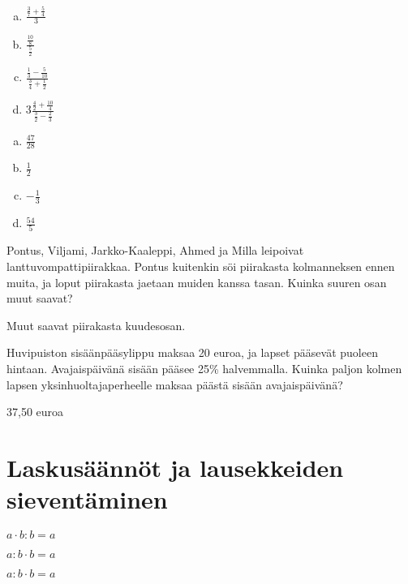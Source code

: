 \begin{tehtava} %

\begin{enumerate}[a)]
	\item $ \frac{\frac{3}{7} + \frac{5}{4}}{3}$
	\item $ \frac{\frac{10}{8}}{\frac{5}{2}}$
	\item $ \frac{\frac{1}{3} - \frac{5}{10}}{\frac{3}{4} + \frac{1}{2}}$
	\item $ 3\frac{\frac{4}{2} + \frac{10}{4}}{\frac{3}{2} - \frac{2}{3}}$
\end{enumerate}
    \begin{vastaus}		
		\begin{enumerate}[a)]
			\item $\frac{47}{28}$
			\item $\frac{1}{2}$
			\item $-\frac{1}{3}$
			\item $\frac{54}{5}$
		\end{enumerate}
    \end{vastaus}
\end{tehtava}

\begin{tehtava} %
    Pontus, Viljami, Jarkko-Kaaleppi, Ahmed ja Milla leipoivat lanttuvompattipiirakkaa.
    Pontus kuitenkin söi piirakasta kolmanneksen ennen muita, ja loput piirakasta
    jaetaan muiden kanssa tasan. Kuinka suuren osan muut saavat?
    
    \begin{vastaus}
        Muut saavat piirakasta kuudesosan.
    \end{vastaus}
\end{tehtava}

\begin{tehtava} %
    Huvipuiston sisäänpääsylippu maksaa 20 euroa, ja lapset pääsevät puoleen
    hintaan. Avajaispäivänä sisään pääsee 25\% halvemmalla. Kuinka paljon kolmen
    lapsen yksinhuoltajaperheelle maksaa päästä sisään avajaispäivänä?
    
    \begin{vastaus}
        37,50 euroa
    \end{vastaus}
\end{tehtava}

\chapter{Laskusäännöt ja lausekkeiden sieventäminen}



$a\cdot b:b=a$

$a:b\cdot b=a$

$a:b\cdot b=a$
